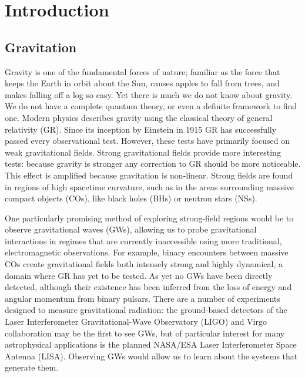 \chapter{Introduction}\setcounter{page}{1}

\section{Gravitation}

Gravity is one of the fundamental forces of nature; familiar as the force that keeps the Earth in orbit about the Sun, causes apples to fall from trees, and makes falling off a log so easy. Yet there is much we do not know about gravity. We do not have a complete quantum theory, or even a definite framework to find one. Modern physics describes gravity using the classical theory of general relativity (GR)\cite{Misner1973}. Since its inception by Einstein in 1915 GR has successfully passed every observational test\cite{Will2006}. However, these tests have primarily focused on weak gravitational fields. Strong gravitational fields provide more interesting tests: because gravity is stronger any correction to GR should be more noticeable. This effect is amplified because gravitation is non-linear. Strong fields are found in regions of high spacetime curvature, such as in the areas surrounding massive compact objects (COs), like black holes (BHs) or neutron stars (NSs).

One particularly promising method of exploring strong-field regions would be to observe gravitational waves (GWs), allowing us to probe gravitational interactions in regimes that are currently inaccessible using more traditional, electromagnetic observations. For example, binary encounters between massive COs create gravitational fields both intensely strong and highly dynamical, a domain where GR has yet to be tested. As yet no GWs have been directly detected, although their existence has been inferred from the loss of energy and angular momentum from binary pulsars\cite{Stairs2003}. There are a number of experiments designed to measure gravitational radiation: the ground-based detectors of the Laser Interferometer Gravitational-Wave Observatory (LIGO)\cite{Abramovici1992, Abbott2009} and Virgo\cite{Accadia2010} collaboration may be the first to see GWs, but of particular interest for many astrophysical applications is the planned NASA/ESA Laser Interferometer Space Antenna (LISA)\cite{Bender1998,Danzmann2003}. Observing GWs would allow us to learn about the systems that generate them.

